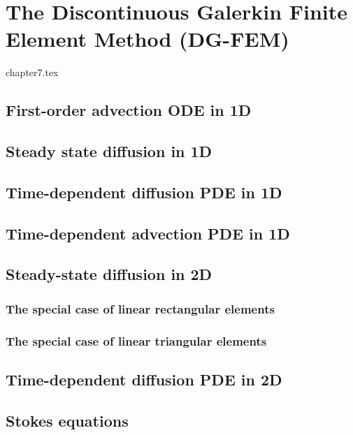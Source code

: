 \chapter{The Discontinuous Galerkin Finite Element Method (DG-FEM) \label{dgfem}} %

\begin{flushright} {\tiny {\color{gray} chapter7.tex}} \end{flushright}



\section{First-order advection ODE in 1D} 
\section{Steady state diffusion in 1D \label{ss:dgss1D}} 
\section{Time-dependent diffusion PDE in 1D} 

\newpage
\section{Time-dependent advection PDE in 1D \label{ss:dgfem1D_adv}}  %

\newpage
\section{Steady-state diffusion in 2D} 
\subsection{The special case of linear rectangular elements} 
\subsection{The special case of linear triangular elements} 

\section{Time-dependent diffusion PDE in 2D}

\newpage
\section{Stokes equations} 

